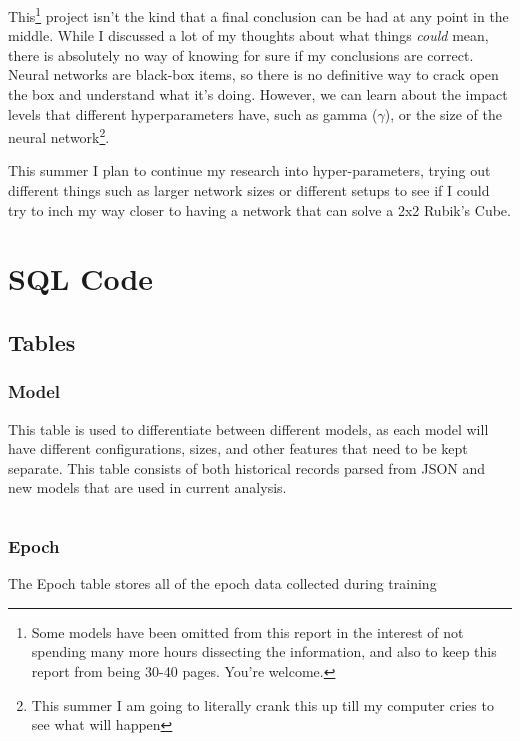 \documentclass[12pt]{article}
\begin{document}
This\footnote{Some models have been omitted from this report in the interest of not spending many more hours dissecting the information, and also to keep this report from being 30-40 pages. You're welcome.} project isn't the kind that a final conclusion can be had at any point in the middle. While I discussed a lot of my thoughts about what things \textit{could} mean, there is absolutely no way of knowing for sure if my conclusions are correct. Neural networks are black-box items, so there is no definitive way to crack open the box and understand what it's doing. However, we can learn about the impact levels that different hyperparameters have, such as gamma ($\gamma$), or the size of the neural network\footnote{This summer I am going to literally crank this up till my computer cries to see what will happen}.

This summer I plan to continue my research into hyper-parameters, trying out different things such as larger network sizes or different setups to see if I could try to inch my way closer to having a network that can solve a 2x2 Rubik's Cube.


\newpage

\appendix

\section{SQL Code}

\subsection{Tables}

\subsubsection{Model}

This table is used to differentiate between different models, as each model will have different configurations, sizes, and other features that need to be kept separate. This table consists of both historical records parsed from JSON and new models that are used in current analysis.

\inputminted{SQL}{../../sql/tables/model.sql}

\subsubsection{Epoch}

The Epoch table stores all of the epoch data collected during training
\end{document}
